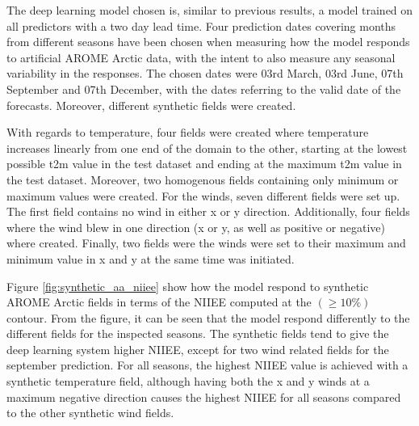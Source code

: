\documentclass[../main/thesis.tex]{subfiles}
\begin{document}
The deep learning model chosen is, similar to previous results, a model trained on all predictors with a two day lead time. Four prediction dates covering months from different seasons have been chosen when measuring how the model responds to artificial AROME Arctic data, with the intent to also measure any seasonal variability in the responses. The chosen dates were 03rd March, 03rd June, 07th September and 07th December, with the dates referring to the valid date of the forecasts. Moreover, different synthetic fields were created. 

With regards to temperature, four fields were created where temperature increases linearly from one end of the domain to the other, starting at the lowest possible t2m value in the test dataset and ending at the maximum t2m value in the test dataset. Moreover, two homogenous fields containing only minimum or maximum values were created. For the winds, seven different fields were set up. The first field contains no wind in either x or y direction. Additionally, four fields where the wind blew in one direction (x or y, as well as positive or negative) where created. Finally, two fields were the winds were set to their maximum and minimum value in x and y at the same time was initiated.

Figure \ref{fig:synthetic_aa_niiee} show how the model respond to synthetic AROME Arctic fields in terms of the NIIEE computed at the $(\geq10\%)$ contour. From the figure, it can be seen that the model respond differently to the different fields for the inspected seasons. The synthetic fields tend to give the deep learning system higher NIIEE, except for two wind related fields for the september prediction. For all seasons, the highest NIIEE value is achieved with a synthetic temperature field, although having both the x and y winds at a maximum negative direction causes the highest NIIEE for all seasons compared to the other synthetic wind fields.
\end{document}
